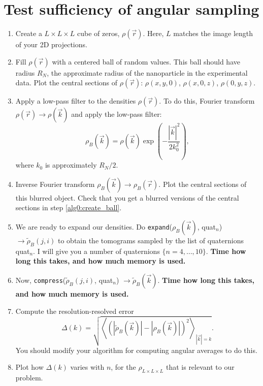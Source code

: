 \documentclass{article}
\begin{document}
\section{Test sufficiency of angular sampling}

\begin{enumerate}
	\item{}Create a $L\times L \times L$ cube of zeros, $\rho(\vec{r})$. Here, $L$ matches the image length of your 2D projections.

	\item{}Fill $\rho(\vec{r})$ with a centered ball of random values. This ball should have radius $R_N$, the approximate radius of the nanoparticle in the experimental data. Plot the central sections of $\rho(\vec{r})$: $\rho(x,y,0)$, $\rho(x,0,z)$, $\rho(0,y,z)$. \label{alg0:create_ball}

	\item{}Apply a low-pass filter to the densities $\rho(\vec{r})$. To do this, Fourier transform $\rho(\vec{r}) \to \rho(\vec{k})$ and apply the low-pass filter:
		\begin{equation}
			\rho_B(\vec{k}) = \rho(\vec{k}) \exp{\left(-\frac{|\vec{k}|^2}{2 k_0^2}\right)}, 
		\end{equation}
		where $k_0$ is approximately $R_N/2$.
		
	\item{}Inverse Fourier transform $\rho_B(\vec{k}) \to \rho_B(\vec{r})$. Plot the central sections of this blurred object. Check that you get a blurred versions of the central sections in step \ref{alg0:create_ball}.

	\item{}We are ready to expand our densities. Do \texttt{expand}($\rho_B(\vec{k})$, quat$_n$) $\to \widetilde{\rho}_B(j,i)$ to obtain the tomograms sampled by the list of quaternions quat$_n$. I will give you a number of quaternions $\{n=4,\ldots,10\}$. {\bf Time how long this takes, and how much memory is used.}
	\item{}Now, \texttt{compress}($\widetilde{\rho}_B(j,i)$, quat$_n$) $\to \widetilde{\rho}_B(\vec{k})$. {\bf Time how long this takes, and how much memory is used.}
	\item{} Compute the resolution-resolved error 
		\begin{equation}
			\Delta(k) = \sqrt{\left\langle \left( |\widetilde{\rho}_B(\vec{k})| - |\rho_B(\vec{k})|\right)^2 \right\rangle_{|\vec{k}| = k}}.
		\end{equation}
		You should modify your algorithm for computing angular averages to do this.
	\item{}Plot how $\Delta(k)$ varies with $n$, for the $\rho_{L\times L \times L}$ that is relevant to our problem.
\end{enumerate}
\end{document}
